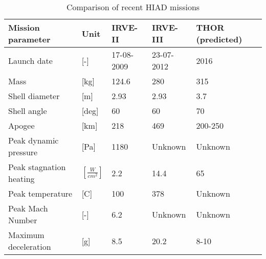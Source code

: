 \begin{table}[h!]
	\caption{Comparison of recent HIAD missions} \label{tab:hiadcomparison}%
		\begin{tabular}{|p{}|p{}|p{}|p{}|p{}|} %
			\hline

       Mission parameter   &       Unit &     IRVE-II \cite{Dillman2010} &     IRVE-III \citep{Dillman2012,Dillman2014} & THOR (predicted) \citep{Dillman2014} \\
			\hline \hline

Launch date &          [-] & 17-08-2009 & 23-07-2012 &       2016 \\
			\hline

      Mass &         [kg] &    124.6 &        280 &        315 \\
			\hline

Shell diameter &          [m] &       2.93 &       2.93 &        3.7 \\
			\hline

Shell angle &     [deg] &         60 &         60 &         70 \\
			\hline

    Apogee &         [km] &        218 &        469 &    200-250 \\
			\hline

Peak dynamic pressure &         [Pa] &       1180 &   Unknown         &   Unknown         \\
			\hline

Peak stagnation heating &     $ [\frac{W}{cm^{2}}]$ &        2.2 &       14.4 &         65 \\
			\hline

Peak temperature &          [C] &        100 &        378 &      Unknown      \\
			\hline

Peak Mach Number &          [-] &        6.2 &  Unknown          &   Unknown         \\
			\hline

Maximum deceleration &          [g] &        8.5 &       20.2 &       8-10 \\
			\hline

		\end{tabular}
    
\end{table}


